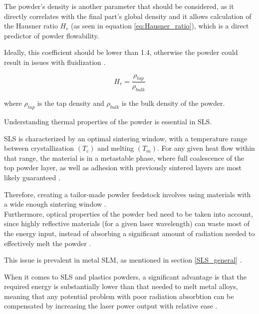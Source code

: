 \documentclass{article}
\begin{document}
    The powder's density is another parameter that should be considered, as it directly correlates with the final part's 
    global density and it allows calculation of the Hausner ratio $H_r$ (as seen in equation \ref{eq:Hausner_ratio}), which is a direct predictor of powder flowability. 
    
    Ideally, this coefficient should be lower than 1.4, otherwise the powder could result in issues with fluidization \autocite*{doi:10.1063/1.4918516}. 

    \begin{equation}
        H_r = \frac{\rho_{tap}}{\rho_{bulk}}
        \label{eq:Hausner_ratio}
    \end{equation} 

    where $\rho_{tap}$ is the tap density and $\rho_{bulk}$ is the bulk density of the powder. 

    \clearpage



    Understanding thermal properties of the powder is essential in SLS. 


    SLS is characterized by an optimal sintering window, with a temperature range between
    crystallization $(T_c)$ and melting $(T_m)$. 
    For any given heat flow within that range, the material is in a metastable phase, 
    where full coalescence of the top powder layer, as well as adhesion with previously sintered layers are 
    most likely guaranteed \autocite{doi:10.1063/1.4918516}. 

    Therefore, creating a tailor-made powder feedstock involves using materials with a wide enough 
    sintering window \autocites*{DechetMaximilianA2020OtDo}{doi:10.1063/1.4918516}. \\

    Furthermore, optical properties of the powder bed need to be taken into account, since highly reflective materials (for a given 
    laser wavelength) can waste most of the energy input, instead of absorbing a significant amount of radiation needed to 
    effectively melt the powder \autocite{doi:10.1063/1.4918516}.  

    This issue is prevalent in metal SLM, as mentioned in section \ref{SLS_general} \autocites{doi:10.1063/1.4918516, Latvian_additive}. 
    
    When it comes to SLS and plastics powders, a significant advantage is that the required energy is substantially lower than that needed to melt metal alloys, 
    meaning that any potential problem with poor radiation absorbtion can be compensated by increasing the 
    laser power output with relative ease \autocite{doi:10.1063/1.4918516}. \\ 
    
\end{document}
